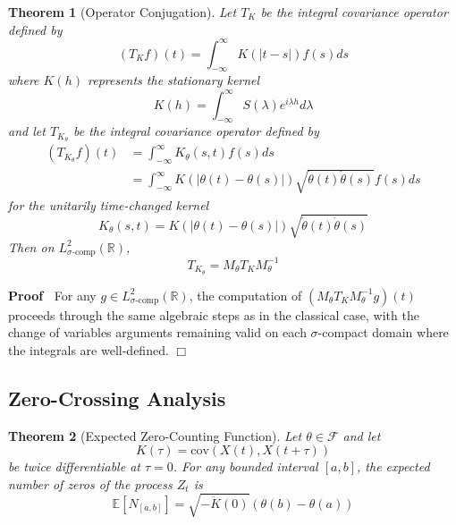 \documentclass{article}
\newenvironment{proof}{\noindent\textbf{Proof\ }}{\hspace*{\fill}$\Box$\medskip}
\newtheorem{theorem}{Theorem}
\begin{document}
\begin{theorem}
  [Operator Conjugation]\label{thm:operator_conjugation} Let $T_K$ be the
  integral covariance operator defined by
  \begin{equation}
    \label{eq:integral_op_original} (T_K f) (t) = \int_{- \infty}^{\infty} K
    (|t - s|) f (s) ds
  \end{equation}
  where $K (h)$ represents the stationary kernel
  \begin{equation}
    K (h) = \int_{- \infty}^{\infty} S (\lambda) e^{i \lambda h} d \lambda
  \end{equation}
  and let $T_{K_{\theta}}$ be the integral covariance operator defined by
  \begin{equation}
    \label{eq:integral_op_transformed}
    
    \begin{aligned}
      (T_{K_{\theta}} f) (t) & = \int_{- \infty}^{\infty} K_{\theta} (s, t) f
      (s) ds\\
      & = \int_{- \infty}^{\infty} K (| \theta (t) - \theta (s) |)
      \sqrt{\dot{\theta} (t)  \dot{\theta} (s)} f (s) ds
    \end{aligned}
  \end{equation}
  for the unitarily time-changed kernel
  \begin{equation}
    K_{\theta} (s, t) = K (| \theta (t) - \theta (s) |) \sqrt{\dot{\theta} (t)
    \dot{\theta} (s)}
  \end{equation}
  Then on $L^2_{\sigma \text{-comp}} (\mathbb{R})$,
  \begin{equation}
    \label{eq:conjugation} T_{K_{\theta}} = M_{\theta} T_K M_{\theta}^{- 1}
  \end{equation}
\end{theorem}

\begin{proof}
  For any $g \in L^2_{\sigma \text{-comp}} (\mathbb{R})$, the computation of
  $(M_{\theta} T_K M_{\theta}^{- 1} g) (t)$ proceeds through the same
  algebraic steps as in the classical case, with the change of variables
  arguments remaining valid on each $\sigma$-compact domain where the
  integrals are well-defined.
\end{proof}

\subsection{Zero-Crossing Analysis}

\begin{theorem}
  [Expected Zero-Counting Function]\label{thm:zero_count} Let $\theta \in
  \mathcal{F}$ and let
  \begin{equation}
    K (\tau) = \mathrm{cov} (X (t), X (t + \tau))
  \end{equation}
  be twice differentiable at $\tau = 0$. For any bounded interval $[a, b]$,
  the expected number of zeros of the process $Z_t$ is
  \begin{equation}
    \label{eq:zero_count} \mathbb{E} [N_{[a, b]}] = \sqrt{- \ddot{K} (0)} 
    (\theta (b) - \theta (a))
  \end{equation}
\end{theorem}
\end{document}
